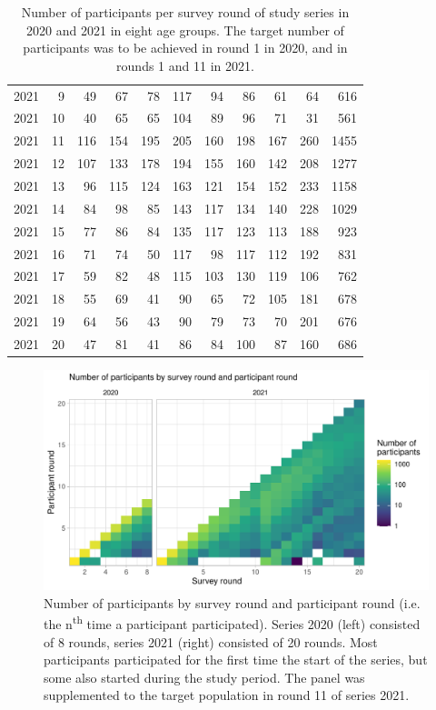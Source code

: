 \documentclass[fleqn,10pt]{wlscirep}
\begin{document}
\begin{table}[ht]
\begin{tabular}{rrrrrrrrrrr}
  2021 &   9 &  49 &  67 &  78 & 117 &  94 &  86 &  61 &  64 & 616 \\ 
  2021 &  10 &  40 &  65 &  65 & 104 &  89 &  96 &  71 &  31 & 561 \\ 
  2021 &  11 & 116 & 154 & 195 & 205 & 160 & 198 & 167 & 260 & 1455 \\ 
  2021 &  12 & 107 & 133 & 178 & 194 & 155 & 160 & 142 & 208 & 1277 \\ 
  2021 &  13 &  96 & 115 & 124 & 163 & 121 & 154 & 152 & 233 & 1158 \\ 
  2021 &  14 &  84 &  98 &  85 & 143 & 117 & 134 & 140 & 228 & 1029 \\ 
  2021 &  15 &  77 &  86 &  84 & 135 & 117 & 123 & 113 & 188 & 923 \\ 
  2021 &  16 &  71 &  74 &  50 & 117 &  98 & 117 & 112 & 192 & 831 \\ 
  2021 &  17 &  59 &  82 &  48 & 115 & 103 & 130 & 119 & 106 & 762 \\ 
  2021 &  18 &  55 &  69 &  41 &  90 &  65 &  72 & 105 & 181 & 678 \\ 
  2021 &  19 &  64 &  56 &  43 &  90 &  79 &  73 &  70 & 201 & 676 \\ 
  2021 &  20 &  47 &  81 &  41 &  86 &  84 & 100 &  87 & 160 & 686 \\ 
   \hline
\end{tabular}
\caption{\label{tab:part_round}Number of participants per survey round of study series in 2020 and 2021 in eight age groups. The target number of participants was to be achieved in round 1 in 2020, and in rounds 1 and 11 in 2021.} 
\end{table}

\begin{figure}[ht]
\centering
\includegraphics[width=\linewidth]{../figures/participant_rounds.pdf}
\caption{Number of participants by survey round and participant round (i.e. the n\textsuperscript{th} time a participant participated). Series 2020 (left) consisted of 8 rounds, series 2021 (right) consisted of 20 rounds. Most participants participated for the first time the start of the series, but some also started during the study period. The panel was supplemented to the target population in round 11 of series 2021.}
\label{fig:part_round}
\end{figure}
\end{document}
